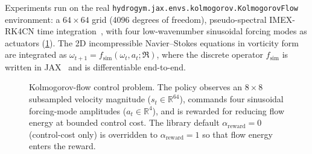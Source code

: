 Experiments run on the real
\texttt{hydrogym.jax.\allowbreak envs.\allowbreak kolmogorov.\allowbreak KolmogorovFlow} environment: a
$64\times 64$ grid (4096 degrees of freedom), pseudo-spectral IMEX-RK4CN
time integration~\cite{hydrogym2026,jaxcfd2021}, with four low-wavenumber
sinusoidal forcing modes as actuators (\cref{fig:env}). The 2D
incompressible Navier--Stokes equations in vorticity form are integrated as
$\omega_{t+1}=f_{\mathrm{sim}}(\omega_t, a_t;\Re)$, where the discrete
operator $f_{\mathrm{sim}}$ is written in JAX~\cite{jax2018} and is differentiable
end-to-end.

\begin{figure}[t]
\centering
{}
\caption{Kolmogorov-flow control problem. The policy observes an $8\times 8$
subsampled velocity magnitude ($s_t\in\mathbb{R}^{64}$), commands four
sinusoidal forcing-mode amplitudes ($a_t\in\mathbb{R}^{4}$), and is rewarded
for reducing flow energy at bounded control cost. The library default
$\alpha_{\text{reward}}=0$ (control-cost only) is overridden to
$\alpha_{\text{reward}}=1$ so that flow energy enters the reward.}
\label{fig:env}
\end{figure}


